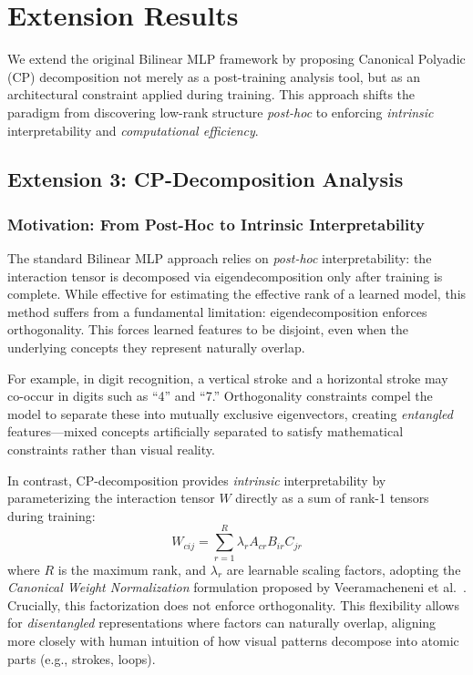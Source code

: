 \section{Extension Results}
\label{sec:extension}

We extend the original Bilinear MLP framework by proposing Canonical Polyadic (CP) decomposition not merely as a post-training analysis tool, but as an architectural constraint applied during training. This approach shifts the paradigm from discovering low-rank structure \emph{post-hoc} to enforcing \emph{intrinsic} interpretability and \emph{computational efficiency}.

\subsection{Extension 3: CP-Decomposition Analysis}
\label{sec:extension3}

\subsubsection{Motivation: From Post-Hoc to Intrinsic Interpretability}

The standard Bilinear MLP approach relies on \emph{post-hoc} interpretability: the interaction tensor is decomposed via eigendecomposition only after training is complete. While effective for estimating the effective rank of a learned model, this method suffers from a fundamental limitation: eigendecomposition enforces orthogonality. This forces learned features to be disjoint, even when the underlying concepts they represent naturally overlap.

For example, in digit recognition, a vertical stroke and a horizontal stroke may co-occur in digits such as ``4'' and ``7.'' Orthogonality constraints compel the model to separate these into mutually exclusive eigenvectors, creating \emph{entangled} features—mixed concepts artificially separated to satisfy mathematical constraints rather than visual reality.

In contrast, CP-decomposition provides \emph{intrinsic} interpretability by parameterizing the interaction tensor $W$ directly as a sum of rank-1 tensors during training:
\begin{equation}
    W_{cij} = \sum_{r=1}^{R} \lambda_r A_{cr} B_{ir} C_{jr}
    \label{eq:cp_factorization}
\end{equation}
where $R$ is the maximum rank, and $\lambda_r$ are learnable scaling factors, adopting the \emph{Canonical Weight Normalization} formulation proposed by Veeramacheneni et al.~\cite{veeramacheneni2022canonical}. Crucially, this factorization does not enforce orthogonality. This flexibility allows for \emph{disentangled} representations where factors can naturally overlap, aligning more closely with human intuition of how visual patterns decompose into atomic parts (e.g., strokes, loops).

